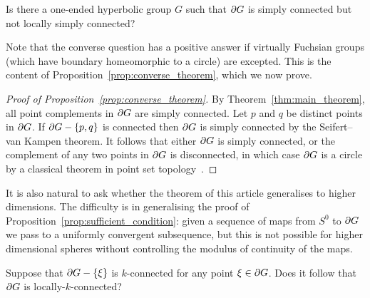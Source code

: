 \documentclass[a4paper]{article}
\begin{document}
\begin{question} 
  Is there a one-ended hyperbolic group $G$ such that $\partial G$ is simply
  connected but not locally simply connected? 
\end{question}

Note that the converse question has a positive answer if virtually Fuchsian
groups (which have boundary homeomorphic to a circle) are excepted. This is the
content of Proposition~\ref{prop:converse_theorem}, which we now prove.

\begin{proof}[Proof of Proposition~\ref{prop:converse_theorem}]
  By Theorem~\ref{thm:main_theorem}, all point complements in $\partial G$ are
  simply connected. Let $p$ and $q$ be distinct points in $\partial G$. If
  $\partial G - \left\{p,q\right\}$ is connected then $\partial G$ is simply connected
  by the Seifert--van Kampen theorem. It follows that either $\partial G$ is
  simply connected, or the complement of any two points in $\partial G$ is
  disconnected, in which case $\partial G$ is a circle
  by a classical theorem in point set topology~\cite[II.2.13]{wilder49}.
\end{proof}

It is also natural to ask whether the theorem of this article generalises to
higher dimensions. The difficulty is in generalising the proof of
Proposition~\ref{prop:sufficient_condition}: given a sequence of maps from $S^0$
to $\partial G$ we pass to a uniformly convergent subsequence, but this is not
possible for higher dimensional spheres without controlling the modulus of
continuity of the maps.

\begin{question} Suppose that $\partial G - \left\{\xi\right\}$ is $k$-connected for any
  point $\xi \in \partial G$. Does it follow that $\partial G$ is
  locally-$k$-connected?
\end{question}


\end{document}
